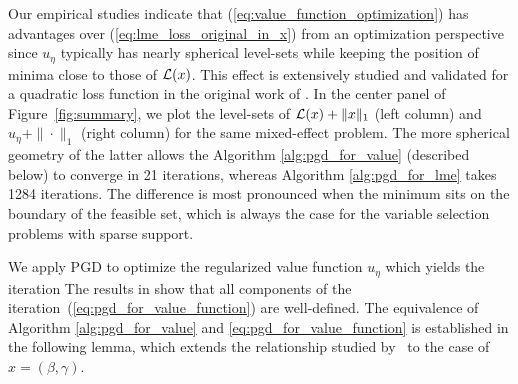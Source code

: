 Our empirical studies indicate that 
(\ref{eq:value_function_optimization}) has advantages over (\ref{eq:lme_loss_original_in_x})
from an optimization perspective since $u_\eta$ typically has nearly spherical level-sets while keeping the position of minima close to those of $\operatorname{\mathcal{L}}(x)$. This effect is extensively studied and validated for a quadratic loss function in the original work  of \cite{Zheng2019SR3}. 
In the center panel of Figure~\ref{fig:summary}, we plot the level-sets of $\operatorname{\mathcal{L}}(x) + \|x\|_1$ (left column) and $u_\eta + \|\cdot\|_1$ (right column) for the same mixed-effect problem. 
The more spherical geometry of the latter allows the Algorithm \ref{alg:pgd_for_value} 
(described below) to converge in 21 iterations, whereas Algorithm \ref{alg:pgd_for_lme} takes 1284 iterations. The difference is most pronounced when the minimum sits on the boundary of the feasible set, which is always the case for the variable selection problems with sparse support.

%

We apply PGD to optimize the regularized value function $u_\eta$ which yields the iteration 
The results in \cite{Theory1} show that all components of the iteration~(\ref{eq:pgd_for_value_function}) are well-defined. 
The equivalence of Algorithm \ref{alg:pgd_for_value} and 
\eqref{eq:pgd_for_value_function} is established in the following lemma, 
which extends the relationship studied by~\cite{Zheng2019SR3} to the case of $x = (\beta, \gamma)$. 

